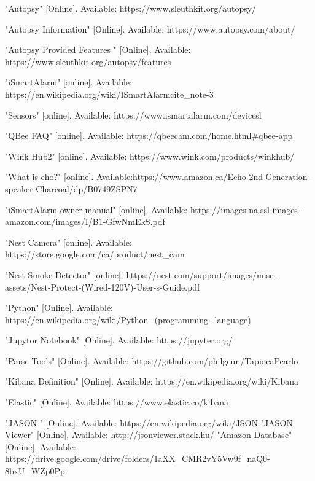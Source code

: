 \documentclass{easychair}
\begin{document}
\begin{thebibliography}{1}

"Autopsy" [Online]. Available: https://www.sleuthkit.org/autopsy/

"Autopsy Information" [Online]. Available: https://www.autopsy.com/about/

"Autopsy Provided Features " [Online]. Available: https://www.sleuthkit.org/autopsy/features

"iSmartAlarm" [online]. Available:  https://en.wikipedia.org/wiki/ISmartAlarmcite\_note-3

"Sensors" [online]. Available: https://www.ismartalarm.com/devicesl

"QBee FAQ" [online]. Available:  https://qbeecam.com/home.html\#qbee-app

"Wink Hub2" [online]. Available: https://www.wink.com/products/wink\-hub/

"What is eho?" [online]. Available:https://www.amazon.ca/Echo-2nd-Generation-speaker-Charcoal/dp/B0749ZSPN7

"iSmartAlarm owner manual" [online]. Available: https://images-na.ssl-images-amazon.com/images/I/B1-GfwNmEkS.pdf

"Nest Camera" [online]. Available: https://store.google.com/ca/product/nest\_cam

"Nest Smoke Detector" [online].
https://nest.com/support/images/misc-assets/Nest-Protect-(Wired-120V)-User-s-Guide.pdf


"Python" [Online]. Available: https://en.wikipedia.org/wiki/Python\_(programming\_language)

"Jupytor Notebook" [Online]. Available: https://jupyter.org/

"Parse Tools" [Online]. Available: https://github.com/philgeun/TapiocaPearlo

"Kibana Definition" [Online]. Available: https://en.wikipedia.org/wiki/Kibana

"Elastic" [Online]. Available: https://www.elastic.co/kibana

"JASON " [Online]. Available: https://en.wikipedia.org/wiki/JSON
"JASON Viewer" [Online]. Available:  http://jsonviewer.stack.hu/
"Amazon Database" [Online]. Available:  https://drive.google.com/drive/folders/1aXX\_CMR2vY5Vw9f\_naQ0-8bxU\_WZp0Pp



\end{thebibliography}
\end{document}
